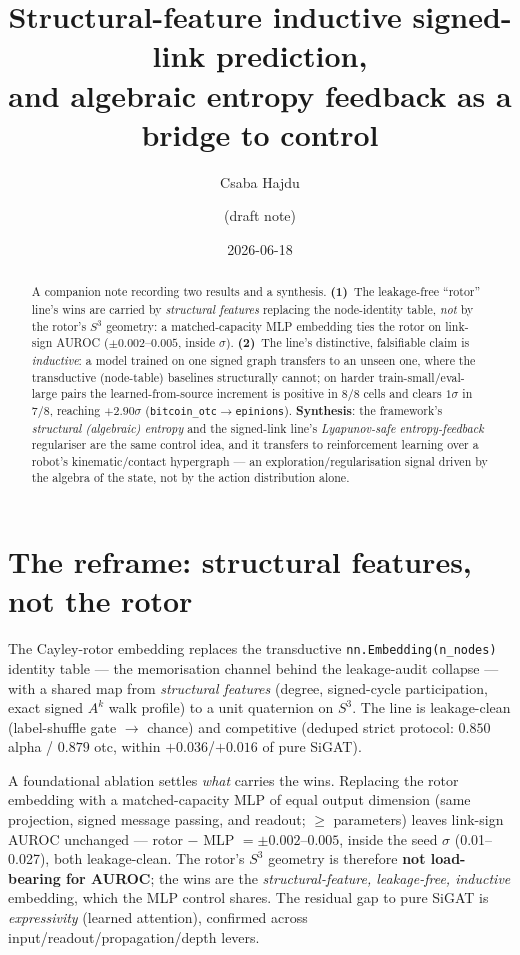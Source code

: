 \documentclass[11pt, a4paper]{article}
\title{Structural-feature inductive signed-link prediction,\\
and algebraic entropy feedback as a bridge to control}
\author{Csaba Hajdu \and (draft note)}
\date{2026-06-18}
\begin{document}
\maketitle

\begin{abstract}
A companion note recording two results and a synthesis. \textbf{(1)}~The
leakage-free ``rotor'' line's wins are carried by \emph{structural features}
replacing the node-identity table, \emph{not} by the rotor's $S^3$ geometry: a
matched-capacity MLP embedding ties the rotor on link-sign AUROC ($\pm0.002$--$0.005$,
inside $\sigma$). \textbf{(2)}~The line's distinctive, falsifiable claim is
\emph{inductive}: a model trained on one signed graph transfers to an unseen one,
where the transductive (node-table) baselines structurally cannot; on harder
train-small/eval-large pairs the learned-from-source increment is positive in $8/8$
cells and clears $1\sigma$ in $7/8$, reaching $+2.90\sigma$
(\texttt{bitcoin\_otc}$\to$\texttt{epinions}). \textbf{Synthesis}: the framework's
\emph{structural (algebraic) entropy} and the signed-link line's \emph{Lyapunov-safe
entropy-feedback} regulariser are the same control idea, and it transfers to
reinforcement learning over a robot's kinematic/contact hypergraph --- an
exploration/regularisation signal driven by the algebra of the state, not by the
action distribution alone.
\end{abstract}

\section{The reframe: structural features, not the rotor}
The Cayley-rotor embedding replaces the transductive \texttt{nn.Embedding(n\_nodes)}
identity table --- the memorisation channel behind the leakage-audit collapse --- with a
shared map from \emph{structural features} (degree, signed-cycle participation, exact
signed $A^k$ walk profile) to a unit quaternion on $S^3$. The line is leakage-clean
(label-shuffle gate $\to$ chance) and competitive (deduped strict protocol: $0.850$ alpha
/ $0.879$ otc, within $+0.036$/$+0.016$ of pure SiGAT).

A foundational ablation settles \emph{what} carries the wins. Replacing the rotor
embedding with a matched-capacity MLP of equal output dimension (same projection, signed
message passing, and readout; $\geq$ parameters) leaves link-sign AUROC unchanged ---
rotor $-$ MLP $=\pm0.002$--$0.005$, inside the seed $\sigma$ (0.01--0.027), both
leakage-clean. The rotor's $S^3$ geometry is therefore \textbf{not load-bearing for
AUROC}; the wins are the \emph{structural-feature, leakage-free, inductive} embedding,
which the MLP control shares. The residual gap to pure SiGAT is \emph{expressivity}
(learned attention), confirmed across input/readout/propagation/depth levers.
\end{document}
